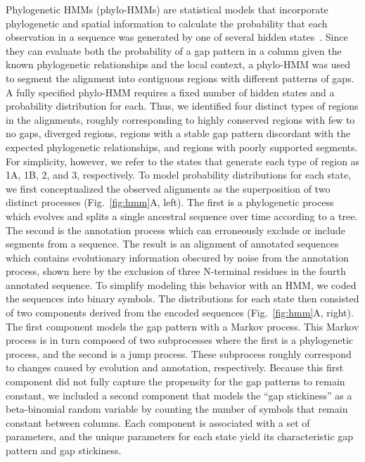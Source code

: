 Phylogenetic HMMs (phylo-HMMs) are statistical models that incorporate phylogenetic and spatial information to calculate the probability that each observation in a sequence was generated by one of several hidden states~\cite{Felsenstein1996}. Since they can evaluate both the probability of a gap pattern in a column given the known phylogenetic relationships and the local context, a phylo-HMM was used to segment the alignment into contiguous regions with different patterns of gaps. A fully specified phylo-HMM requires a fixed number of hidden states and a probability distribution for each. Thus, we identified four distinct types of regions in the alignments, roughly corresponding to highly conserved regions with few to no gaps, diverged regions, regions with a stable gap pattern discordant with the expected phylogenetic relationships, and regions with poorly supported segments. For simplicity, however, we refer to the states that generate each type of region as 1A, 1B, 2, and 3, respectively. To model probability distributions for each state, we first conceptualized the observed alignments as the superposition of two distinct processes (Fig.~\ref{fig:hmm}A, left). The first is a phylogenetic process which evolves and splits a single ancestral sequence over time according to a tree. The second is the annotation process which can erroneously exclude or include segments from a sequence. The result is an alignment of annotated sequences which contains evolutionary information obscured by noise from the annotation process, shown here by the exclusion of three N-terminal residues in the fourth annotated sequence. To simplify modeling this behavior with an HMM, we coded the sequences into binary symbols. The distributions for each state then consisted of two components derived from the encoded sequences (Fig.~\ref{fig:hmm}A, right). The first component models the gap pattern with a Markov process. This Markov process is in turn composed of two subprocesses where the first is a phylogenetic process, and the second is a jump process. These subprocess roughly correspond to changes caused by evolution and annotation, respectively. Because this first component did not fully capture the propensity for the gap patterns to remain constant, we included a second component that models the ``gap stickiness'' as a beta-binomial random variable by counting the number of symbols that remain constant between columns. Each component is associated with a set of parameters, and the unique parameters for each state yield its characteristic gap pattern and gap stickiness.

